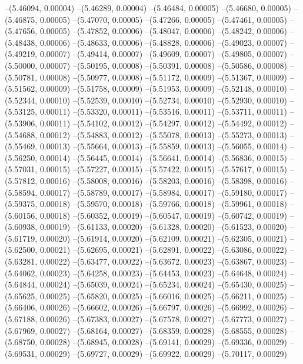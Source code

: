 --(5.46094, 0.00004)
--(5.46289, 0.00004)
--(5.46484, 0.00005)
--(5.46680, 0.00005)
--(5.46875, 0.00005)
--(5.47070, 0.00005)
--(5.47266, 0.00005)
--(5.47461, 0.00005)
--(5.47656, 0.00005)
--(5.47852, 0.00006)
--(5.48047, 0.00006)
--(5.48242, 0.00006)
--(5.48438, 0.00006)
--(5.48633, 0.00006)
--(5.48828, 0.00006)
--(5.49023, 0.00007)
--(5.49219, 0.00007)
--(5.49414, 0.00007)
--(5.49609, 0.00007)
--(5.49805, 0.00007)
--(5.50000, 0.00007)
--(5.50195, 0.00008)
--(5.50391, 0.00008)
--(5.50586, 0.00008)
--(5.50781, 0.00008)
--(5.50977, 0.00008)
--(5.51172, 0.00009)
--(5.51367, 0.00009)
--(5.51562, 0.00009)
--(5.51758, 0.00009)
--(5.51953, 0.00009)
--(5.52148, 0.00010)
--(5.52344, 0.00010)
--(5.52539, 0.00010)
--(5.52734, 0.00010)
--(5.52930, 0.00010)
--(5.53125, 0.00011)
--(5.53320, 0.00011)
--(5.53516, 0.00011)
--(5.53711, 0.00011)
--(5.53906, 0.00011)
--(5.54102, 0.00012)
--(5.54297, 0.00012)
--(5.54492, 0.00012)
--(5.54688, 0.00012)
--(5.54883, 0.00012)
--(5.55078, 0.00013)
--(5.55273, 0.00013)
--(5.55469, 0.00013)
--(5.55664, 0.00013)
--(5.55859, 0.00013)
--(5.56055, 0.00014)
--(5.56250, 0.00014)
--(5.56445, 0.00014)
--(5.56641, 0.00014)
--(5.56836, 0.00015)
--(5.57031, 0.00015)
--(5.57227, 0.00015)
--(5.57422, 0.00015)
--(5.57617, 0.00015)
--(5.57812, 0.00016)
--(5.58008, 0.00016)
--(5.58203, 0.00016)
--(5.58398, 0.00016)
--(5.58594, 0.00017)
--(5.58789, 0.00017)
--(5.58984, 0.00017)
--(5.59180, 0.00017)
--(5.59375, 0.00018)
--(5.59570, 0.00018)
--(5.59766, 0.00018)
--(5.59961, 0.00018)
--(5.60156, 0.00018)
--(5.60352, 0.00019)
--(5.60547, 0.00019)
--(5.60742, 0.00019)
--(5.60938, 0.00019)
--(5.61133, 0.00020)
--(5.61328, 0.00020)
--(5.61523, 0.00020)
--(5.61719, 0.00020)
--(5.61914, 0.00020)
--(5.62109, 0.00021)
--(5.62305, 0.00021)
--(5.62500, 0.00021)
--(5.62695, 0.00021)
--(5.62891, 0.00022)
--(5.63086, 0.00022)
--(5.63281, 0.00022)
--(5.63477, 0.00022)
--(5.63672, 0.00023)
--(5.63867, 0.00023)
--(5.64062, 0.00023)
--(5.64258, 0.00023)
--(5.64453, 0.00023)
--(5.64648, 0.00024)
--(5.64844, 0.00024)
--(5.65039, 0.00024)
--(5.65234, 0.00024)
--(5.65430, 0.00025)
--(5.65625, 0.00025)
--(5.65820, 0.00025)
--(5.66016, 0.00025)
--(5.66211, 0.00025)
--(5.66406, 0.00026)
--(5.66602, 0.00026)
--(5.66797, 0.00026)
--(5.66992, 0.00026)
--(5.67188, 0.00026)
--(5.67383, 0.00027)
--(5.67578, 0.00027)
--(5.67773, 0.00027)
--(5.67969, 0.00027)
--(5.68164, 0.00027)
--(5.68359, 0.00028)
--(5.68555, 0.00028)
--(5.68750, 0.00028)
--(5.68945, 0.00028)
--(5.69141, 0.00029)
--(5.69336, 0.00029)
--(5.69531, 0.00029)
--(5.69727, 0.00029)
--(5.69922, 0.00029)
--(5.70117, 0.00029)
